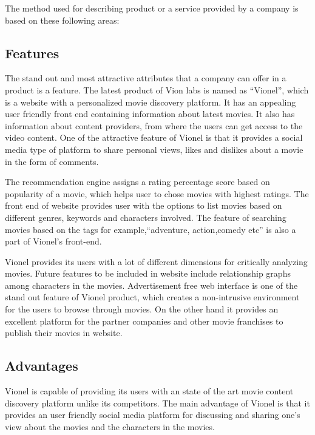 The method used for describing product or a service provided by a company is based on these following areas:
 
  \subsection{Features} %
  \label{sub:features}
  The stand out and most attractive attributes that a company can offer in a product is a feature. The latest product of Vion labs is named as  ``Vionel'', which is a website with a personalized movie discovery platform. It has an appealing user friendly front end containing information about latest movies. It also has information about content providers, from where the users can get access to the video content. One of the attractive feature of Vionel is that it provides a social media type of platform to share personal views, likes and dislikes about a movie in the form of comments.
  
  The recommendation engine assigns a rating percentage score based on popularity of a movie, which helps user to chose movies with highest ratings. The front end of website provides user with the options to list movies based on different genres, keywords and characters involved. The feature of searching movies based on the tags for example,``adventure, action,comedy etc'' is also a part of Vionel's front-end.

  Vionel provides its users with a lot of different dimensions for critically analyzing movies. Future features to be included in website include relationship graphs among characters in the movies. Advertisement free web interface is one of the stand out feature of Vionel product, which creates a non-intrusive environment for the users to browse through movies. On the other hand it provides an excellent platform for the partner companies and other movie franchises to publish their movies in website.      
      
  \subsection{Advantages} %
  \label{sub:Advantages}
  Vionel is capable of providing its users with an state of the art movie content discovery platform unlike its competitors. The main advantage of Vionel is that it provides an user friendly social media platform for discussing and sharing one's view about the movies and the characters in the movies.

